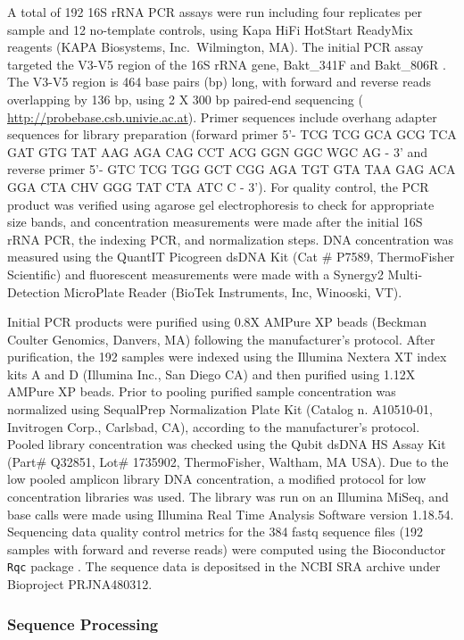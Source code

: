 \documentclass{bmcart}
\begin{document}
A total of 192 16S rRNA PCR assays were run including four replicates
per sample and 12 no-template controls, using Kapa HiFi HotStart
ReadyMix reagents (KAPA Biosystems, Inc.~Wilmington, MA). The initial
PCR assay targeted the V3-V5 region of the 16S rRNA gene, Bakt\_341F and
Bakt\_806R \cite{klindworth2012evaluation}. The V3-V5 region is 464
base pairs (bp) long, with forward and reverse reads overlapping by 136
bp, using 2 X 300 bp paired-end sequencing
\cite{yang2016sensitivity} (
\url{http://probebase.csb.univie.ac.at}). Primer sequences include
overhang adapter sequences for library preparation (forward primer 5'-
TCG TCG GCA GCG TCA GAT GTG TAT AAG AGA CAG CCT ACG GGN GGC WGC AG - 3'
and reverse primer 5'- GTC TCG TGG GCT CGG AGA TGT GTA TAA GAG ACA GGA
CTA CHV GGG TAT CTA ATC C - 3'). For quality control, the PCR product
was verified using agarose gel electrophoresis to check for appropriate
size bands, and concentration measurements were made after the initial
16S rRNA PCR, the indexing PCR, and normalization steps. DNA
concentration was measured using the QuantIT Picogreen dsDNA Kit (Cat \#
P7589, ThermoFisher Scientific) and fluorescent measurements were made
with a Synergy2 Multi-Detection MicroPlate Reader (BioTek Instruments,
Inc, Winooski, VT).

Initial PCR products were purified using 0.8X AMPure XP beads (Beckman
Coulter Genomics, Danvers, MA) following the manufacturer's protocol.
After purification, the 192 samples were indexed using the Illumina
Nextera XT index kits A and D (Illumina Inc., San Diego CA) and then
purified using 1.12X AMPure XP beads. Prior to pooling purified sample
concentration was normalized using SequalPrep Normalization Plate Kit
(Catalog n. A10510-01, Invitrogen Corp., Carlsbad, CA), according to the
manufacturer's protocol. Pooled library concentration was checked using
the Qubit dsDNA HS Assay Kit (Part\# Q32851, Lot\# 1735902,
ThermoFisher, Waltham, MA USA). Due to the low pooled amplicon library
DNA concentration, a modified protocol for low concentration libraries
was used. The library was run on an Illumina MiSeq, and base calls were
made using Illumina Real Time Analysis Software version 1.18.54.
Sequencing data quality control metrics for the 384 fastq sequence files
(192 samples with forward and reverse reads) were computed using the
Bioconductor \texttt{Rqc} package \cite{Rqc,Bioconductor}. The
sequence data is depositsed in the NCBI SRA archive under Bioproject
PRJNA480312.


\subsubsection*{Sequence Processing}
\end{document}

